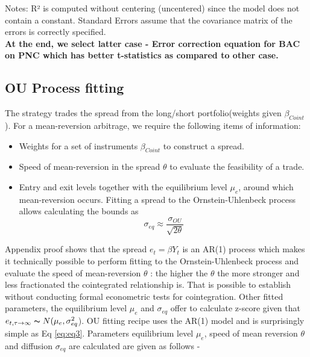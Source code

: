 \documentclass[a4paper, 11pt]{article}
\begin{document}
\begin{enumerate}[A.]
Notes: \newline
 [1] R² is computed without centering (uncentered) since the model does not contain a constant. \newline
 [2] Standard Errors assume that the covariance matrix of the errors is correctly specified.\\

\textbf{At the end, we select latter case - Error correction equation for BAC on PNC which has better t-statistics as compared to other case.}

\end{enumerate}

\pagebreak
\subsection{OU Process fitting}

The strategy trades the spread from the long/short portfolio(weights given  $\beta_{Coint}$).
For a mean-reversion arbitrage, we require the following items of information:

\begin{itemize}
\item Weights for a set of instruments $\beta_{Coint}$ to construct a spread.
\item Speed of mean-reversion in the spread $\theta$ to evaluate the feasibility of a trade.
\item Entry and exit levels together with the equilibrium level $\mu_e$, around which mean-reversion occurs. Fitting a spread to the Ornstein-Uhlenbeck process allows calculating the bounds as $$\sigma_{eq} \approx \frac{\sigma_{OU}}{\sqrt{2\theta}}$$
\end{itemize}

Appendix proof shows that the spread $e_t = \beta Y_t $ is an AR(1) process which makes it technically possible to perform fitting to the Ornstein-Uhlenbeck process and evaluate the speed of mean-reversion $\theta$ : the higher the $\theta$ the more stronger and less fractionated the cointegrated relationship is. That is possible to establish without conducting formal econometric tests for cointegration. Other fitted parameters, the equilibrium level $\mu_e$ and $\sigma_{eq}$ offer to calculate z-score given that $e_{t,\tau \to \infty} \thicksim N(\mu_e,\sigma^2_{eq}$).
OU fitting recipe uses the AR(1) model and is surprisingly simple as Eq \ref{eq:eq3}.
Parameters equilibrium level $\mu_e$, speed of mean reversion $\theta$ and diffusion $\sigma_{eq}$ are calculated are given as follows -
\end{document}
